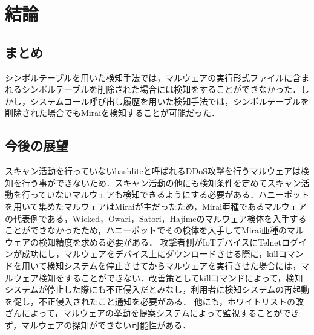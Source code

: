 \chapter{結論}

\section{まとめ}

シンボルテーブルを用いた検知手法では，マルウェアの実行形式ファイルに含まれるシンボルテーブルを削除された場合には検知をすることができなかった．しかし，システムコール呼び出し履歴を用いた検知手法では，シンボルテーブルを削除された場合でもMiraiを検知することが可能だった．

\section{今後の展望}
スキャン活動を行っていないbashliteと呼ばれるDDoS攻撃を行うマルウェアは検知を行う事ができないため．スキャン活動の他にも検知条件を定めてスキャン活動を行っていないマルウェアも検知できるようにする必要がある．ハニーポットを用いて集めたマルウェアはMiraiが主だったため，Mirai亜種であるマルウェアの代表例である，Wicked，Owari，Satori，Hajimeのマルウェア検体を入手することができなかったため，ハニーポットでその検体を入手してMirai亜種のマルウェアの検知精度を求める必要がある．
攻撃者側がIoTデバイスにTelnetログインが成功にし，マルウェアをデバイス上にダウンロードさせる際に，killコマンドを用いて検知システムを停止させてからマルウェアを実行させた場合には，マルウェア検知をすることができない．改善策としてkillコマンドによって，検知システムが停止した際にも不正侵入だとみなし，利用者に検知システムの再起動を促し，不正侵入されたこと通知を必要がある．
他にも，ホワイトリストの改ざんによって，マルウェアの挙動を提案システムによって監視することができず，マルウェアの探知ができない可能性がある．
